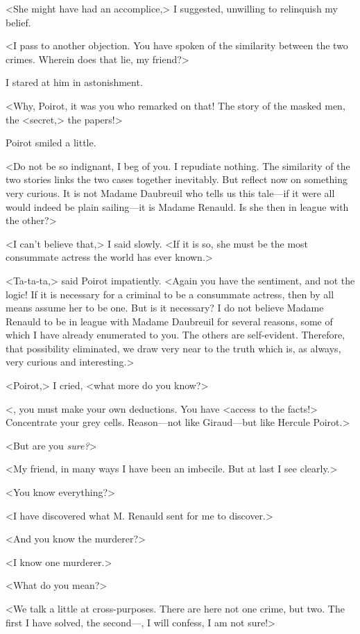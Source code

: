  <She might have had an accomplice,> I suggested, unwilling to relinquish my belief. 

 <I pass to another objection. You have spoken of the similarity between the two crimes. Wherein does that lie, my friend?> 

 I stared at him in astonishment. 

 <Why, Poirot, it was you who remarked on that! The story of the masked men, the <secret,> the papers!> 

 Poirot smiled a little. 

 <Do not be so indignant, I beg of you. I repudiate nothing. The similarity of the two stories links the two cases together inevitably. But reflect now on something very curious. It is not Madame Daubreuil who tells us this tale—if it were all would indeed be plain sailing—it is Madame Renauld. Is she then in league with the other?> 

 <I can't believe that,> I said slowly. <If it is so, she must be the most consummate actress the world has ever known.> 

 <Ta-ta-ta,> said Poirot impatiently. <Again you have the sentiment, and not the logic! If it is necessary for a criminal to be a consummate actress, then by all means assume her to be one. But is it necessary? I do not believe Madame Renauld to be in league with Madame Daubreuil for several reasons, some of which I have already enumerated to you. The others are self-evident. Therefore, that possibility eliminated, we draw very near to the truth which is, as always, very curious and interesting.> 

 <Poirot,> I cried, <what more do you know?> 

 <, you must make your own deductions. You have <access to the facts!> Concentrate your grey cells. Reason—not like Giraud—but like Hercule Poirot.> 

 <But are you \emph{sure?}> 

 <My friend, in many ways I have been an imbecile. But at last I see clearly.> 

 <You know everything?> 

 <I have discovered what M. Renauld sent for me to discover.> 

 <And you know the murderer?> 

 <I know one murderer.> 

 <What do you mean?> 

 <We talk a little at cross-purposes. There are here not one crime, but two. The first I have solved, the second—, I will confess, I am not sure!> 

